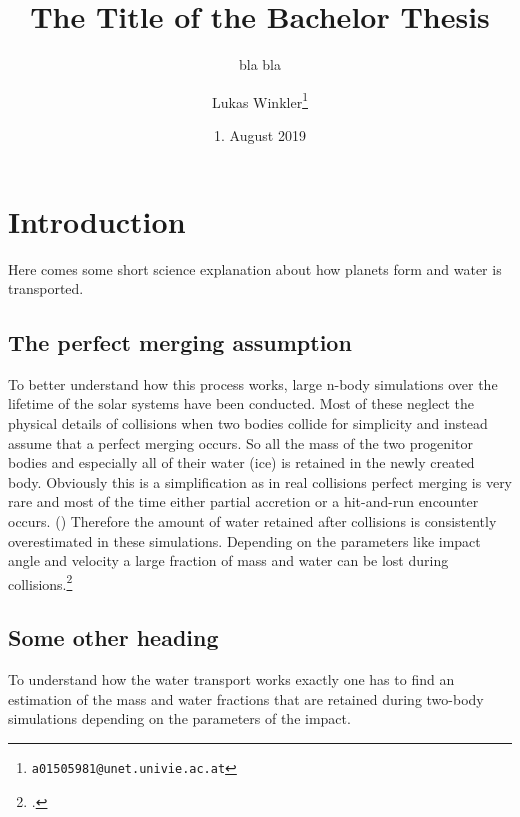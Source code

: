 
\title{The Title of the Bachelor Thesis}
\subtitle{bla bla}
\author{Lukas Winkler\footnote{\texttt{a01505981@unet.univie.ac.at}}}
\date{1. August 2019}

\usepackage{lipsum}  %
\newcommand{\blabla}{Bla bla bla}


	
\maketitle

\tableofcontents

\chapter{Introduction}\label{introduction}


Here comes some short science explanation about how planets form and water is transported.


\section{The perfect merging assumption}

To better understand how this process works, large n-body simulations over the lifetime of the solar systems have been conducted. Most of these neglect the physical details of collisions when two bodies collide for simplicity and instead assume that a perfect merging occurs. So all the mass of the two progenitor bodies and especially all of their water (ice) is retained in the newly created body. Obviously this is a simplification as in real collisions perfect merging is very rare and most of the time either partial accretion or a hit-and-run encounter occurs. (\cite{CollisionTypes}) Therefore the amount of water retained after collisions is consistently overestimated in these simulations. Depending on the parameters like impact angle and velocity a large fraction of mass and water can be lost during collisions.\footcite{MaindlSummary}

\section{Some other heading}

To understand how the water transport works exactly one has to find an estimation of the mass and water fractions that are retained during two-body simulations depending on the parameters of the impact.

